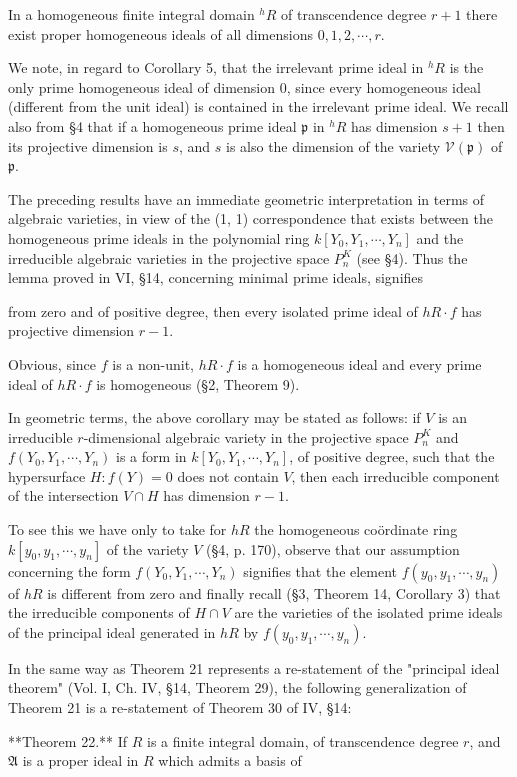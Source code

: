 In a homogeneous finite integral domain $^h R$ of transcendence degree $r + 1$ there exist proper homogeneous ideals of all dimensions $0, 1, 2, \cdots, r$.

We note, in regard to Corollary 5, that the irrelevant prime ideal in $^h R$ is the only prime homogeneous ideal of dimension 0, since every homogeneous ideal (different from the unit ideal) is contained in the irrelevant prime ideal. We recall also from §4 that if a homogeneous prime ideal $\mathfrak{p}$ in $^h R$ has dimension $s + 1$ then its projective dimension is $s$, and $s$ is also the dimension of the variety $\mathcal{V}(\mathfrak{p})$ of $\mathfrak{p}$.

The preceding results have an immediate geometric interpretation in terms of algebraic varieties, in view of the (1, 1) correspondence that exists between the homogeneous prime ideals in the polynomial ring $k[Y_0, Y_1, \cdots, Y_n]$ and the irreducible algebraic varieties in the projective space $P_n^K$ (see §4). Thus the lemma proved in VI, §14, concerning minimal prime ideals, signifies

from zero and of positive degree, then every isolated prime ideal of $hR \cdot f$ has projective dimension $r-1$.

Obvious, since $f$ is a non-unit, $hR \cdot f$ is a homogeneous ideal and every prime ideal of $hR \cdot f$ is homogeneous (§2, Theorem 9).

In geometric terms, the above corollary may be stated as follows: if $V$ is an irreducible $r$-dimensional algebraic variety in the projective space $P_n^K$ and $f(Y_0, Y_1, \cdots, Y_n)$ is a form in $k[Y_0, Y_1, \cdots, Y_n]$, of positive degree, such that the hypersurface $H: f(Y) = 0$ does not contain $V$, then each irreducible component of the intersection $V \cap H$ has dimension $r-1$.

To see this we have only to take for $hR$ the homogeneous coördinate ring $k[y_0, y_1, \cdots, y_n]$ of the variety $V$ (§4, p. 170), observe that our assumption concerning the form $f(Y_0, Y_1, \cdots, Y_n)$ signifies that the element $f(y_0, y_1, \cdots, y_n)$ of $hR$ is different from zero and finally recall (§3, Theorem 14, Corollary 3) that the irreducible components of $H \cap V$ are the varieties of the isolated prime ideals of the principal ideal generated in $hR$ by $f(y_0, y_1, \cdots, y_n)$.

In the same way as Theorem 21 represents a re-statement of the "principal ideal theorem" (Vol. I, Ch. IV, §14, Theorem 29), the following generalization of Theorem 21 is a re-statement of Theorem 30 of IV, §14:

**Theorem 22.** If $R$ is a finite integral domain, of transcendence degree $r$, and $\mathfrak{A}$ is a proper ideal in $R$ which admits a basis of
